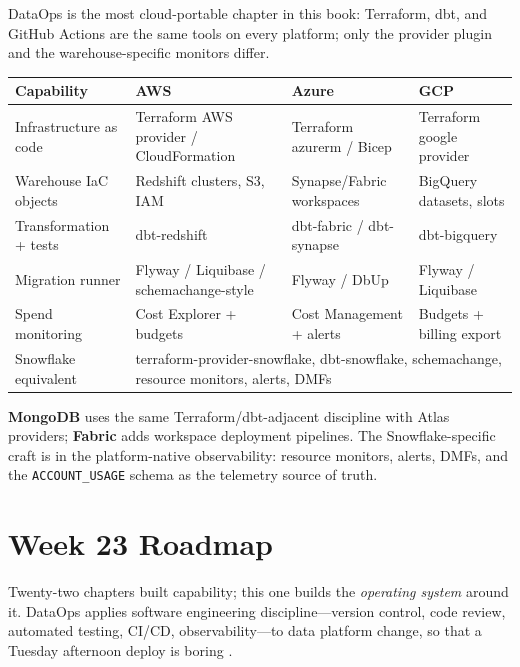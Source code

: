 \begin{crosscloud}
DataOps is the most cloud-portable chapter in this book: Terraform, dbt, and GitHub Actions are the same tools on every platform; only the provider plugin and the warehouse-specific monitors differ.

\vspace{2mm}
{\footnotesize
\begin{tabular}{@{}p{2.8cm}p{3.0cm}p{3.0cm}p{3.0cm}@{}}
\toprule
\textbf{Capability} & \textbf{AWS} & \textbf{Azure} & \textbf{GCP} \\
\midrule
Infrastructure as code & Terraform AWS provider / CloudFormation & Terraform azurerm / Bicep & Terraform google provider \\
Warehouse IaC objects & Redshift clusters, S3, IAM & Synapse/Fabric workspaces & BigQuery datasets, slots \\
Transformation + tests & dbt-redshift & dbt-fabric / dbt-synapse & dbt-bigquery \\
Migration runner & Flyway / Liquibase / schemachange-style & Flyway / DbUp & Flyway / Liquibase \\
Spend monitoring & Cost Explorer + budgets & Cost Management + alerts & Budgets + billing export \\
\addlinespace
Snowflake equivalent & \multicolumn{3}{l}{terraform-provider-snowflake, dbt-snowflake, schemachange, resource monitors, alerts, DMFs} \\
\bottomrule
\end{tabular}}

\vspace{1mm}
\textbf{MongoDB} uses the same Terraform/dbt-adjacent discipline with Atlas providers; \textbf{Fabric} adds workspace deployment pipelines. The Snowflake-specific craft is in the platform-native observability: resource monitors, alerts, DMFs, and the \texttt{ACCOUNT\_USAGE} schema as the telemetry source of truth.
\end{crosscloud}

\section{Week 23 Roadmap}
Twenty-two chapters built capability; this one builds the \emph{operating system} around it. DataOps applies software engineering discipline---version control, code review, automated testing, CI/CD, observability---to data platform change, so that a Tuesday afternoon deploy is boring \cite{terraformDocs,dbtCoreDocs}.

